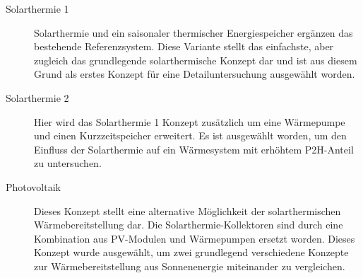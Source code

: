 	\begin{description}
		\item[Solarthermie 1] Solarthermie und ein saisonaler thermischer Energiespeicher ergänzen das bestehende Referenzsystem. Diese Variante stellt das einfachste, aber zugleich das grundlegende solarthermische Konzept dar und ist aus diesem Grund als erstes Konzept für eine Detailuntersuchung ausgewählt worden.

		\item[Solarthermie 2] Hier wird das Solarthermie 1 Konzept zusätzlich um eine Wärmepumpe und einen Kurzzeitspeicher erweitert. Es ist ausgewählt worden, um den Einfluss der Solarthermie auf ein Wärmesystem mit erhöhtem \ac{P2H}-Anteil zu untersuchen.
		
		\item[Photovoltaik] Dieses Konzept stellt eine alternative Möglichkeit der solarthermischen Wärmebereitstellung dar. Die Solarthermie-Kollektoren sind durch eine Kombination aus \ac{PV}-Modulen und Wärmepumpen ersetzt worden. Dieses Konzept wurde ausgewählt, um zwei grundlegend verschiedene Konzepte zur Wärmebereitstellung aus Sonnenenergie miteinander zu vergleichen.		
	\end{description}